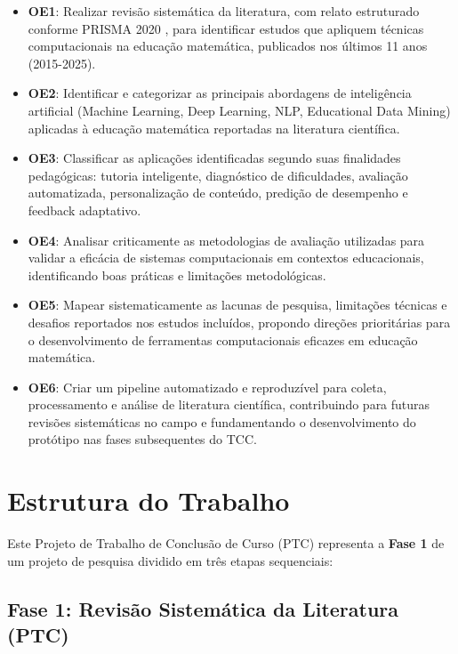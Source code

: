 \begin{itemize}
    \item \textbf{OE1}: Realizar revisão sistemática da literatura, com relato estruturado conforme PRISMA 2020 \cite{PRISMA2020}, para identificar estudos que apliquem técnicas computacionais na educação matemática, publicados nos últimos 11 anos (2015-2025).
    
    \item \textbf{OE2}: Identificar e categorizar as principais abordagens de inteligência artificial (Machine Learning, Deep Learning, NLP, Educational Data Mining) aplicadas à educação matemática reportadas na literatura científica.
    
    \item \textbf{OE3}: Classificar as aplicações identificadas segundo suas finalidades pedagógicas: tutoria inteligente, diagnóstico de dificuldades, avaliação automatizada, personalização de conteúdo, predição de desempenho e feedback adaptativo.
    
    \item \textbf{OE4}: Analisar criticamente as metodologias de avaliação utilizadas para validar a eficácia de sistemas computacionais em contextos educacionais, identificando boas práticas e limitações metodológicas.
    
    \item \textbf{OE5}: Mapear sistematicamente as lacunas de pesquisa, limitações técnicas e desafios reportados nos estudos incluídos, propondo direções prioritárias para o desenvolvimento de ferramentas computacionais eficazes em educação matemática.
    
    \item \textbf{OE6}: Criar um pipeline automatizado e reproduzível para coleta, processamento e análise de literatura científica, contribuindo para futuras revisões sistemáticas no campo e fundamentando o desenvolvimento do protótipo nas fases subsequentes do TCC.
\end{itemize}

\section{Estrutura do Trabalho}

Este Projeto de Trabalho de Conclusão de Curso (PTC) representa a \textbf{Fase 1} de um projeto de pesquisa dividido em três etapas sequenciais:

\subsection{Fase 1: Revisão Sistemática da Literatura (PTC)}

